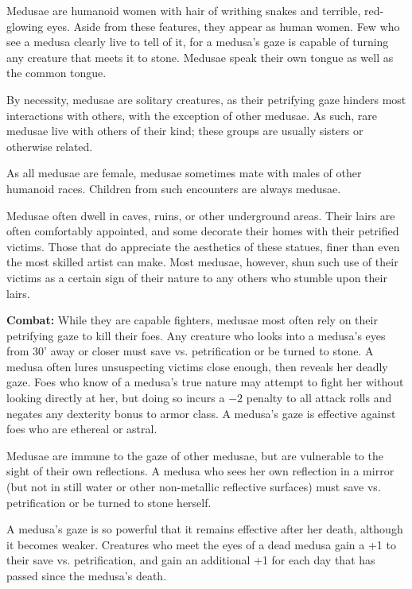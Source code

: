 \begin{multicols}{2}
\begin{minipage}{\columnwidth}
\end{minipage}

Medusae are humanoid women with hair of writhing snakes and terrible, red-glowing eyes. Aside from these features, they appear as human women. Few who see a medusa clearly live to tell of it, for a medusa's gaze is capable of turning any creature that meets it to stone. Medusae speak their own tongue as well as the common tongue.

By necessity, medusae are solitary creatures, as their petrifying gaze hinders most interactions with others, with the exception of other medusae. As such, rare medusae live with others of their kind; these groups are usually sisters or otherwise related. 

As all medusae are female, medusae sometimes mate with males of other humanoid races. Children from such encounters are always medusae.

Medusae often dwell in caves, ruins, or other underground areas. Their lairs are often comfortably appointed, and some decorate their homes with their petrified victims. Those that do appreciate the aesthetics of these statues, finer than even the most skilled artist can make. Most medusae, however, shun such use of their victims as a certain sign of their nature to any others who stumble upon their lairs.

\textbf{Combat:} While they are capable fighters, medusae most often rely on their petrifying gaze to kill their foes. Any creature who looks into a medusa's eyes from 30' away or closer must save vs. petrification or be turned to stone. A medusa often lures unsuspecting victims close enough, then reveals her deadly gaze. Foes who know of a medusa's true nature may attempt to fight her without looking directly at her, but doing so incurs a $-2$ penalty to all attack rolls and negates any dexterity bonus to armor class. A medusa's gaze is effective against foes who are ethereal or astral.

Medusae are immune to the gaze of other medusae, but are vulnerable to the sight of their own reflections. A medusa who sees her own reflection in a mirror (but not in still water or other non-metallic reflective surfaces) must save vs. petrification or be turned to stone herself. 

A medusa's gaze is so powerful that it remains effective after her death, although it becomes weaker. Creatures who meet the eyes of a dead medusa gain a +1 to their save vs. petrification, and gain an additional +1 for each day that has passed since the medusa's death.


\end{multicols}
